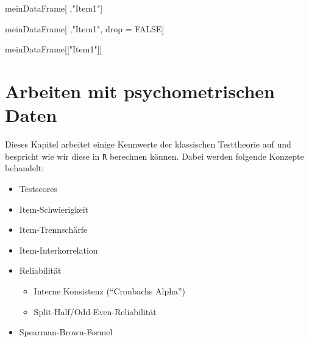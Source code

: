 \documentclass[12pt,]{tufte-book}
\newenvironment{Shaded}{\begin{snugshade}}{\end{snugshade}}
\newcommand{\StringTok}[1]{\textcolor[rgb]{0.31,0.60,0.02}{#1}}
\newcommand{\OtherTok}[1]{\textcolor[rgb]{0.56,0.35,0.01}{#1}}
\newcommand{\OperatorTok}[1]{\textcolor[rgb]{0.81,0.36,0.00}{\textbf{#1}}}
\newcommand{\NormalTok}[1]{#1}
\providecommand{\tightlist}{%
  \setlength{\itemsep}{0pt}\setlength{\parskip}{0pt}}
\theoremstyle{definition}
\theoremstyle{definition}
\theoremstyle{definition}
\theoremstyle{remark}
\begin{document}
\begin{Shaded}
\begin{Highlighting}[]
\NormalTok{meinDataFrame[ ,}\StringTok{"Item1"}\NormalTok{]}
\end{Highlighting}
\end{Shaded}

\begin{Shaded}
\begin{Highlighting}[]
\NormalTok{meinDataFrame[ ,}\StringTok{"Item1"}\NormalTok{, drop =}\StringTok{ }\OtherTok{FALSE}\NormalTok{]}
\end{Highlighting}
\end{Shaded}

\begin{Shaded}
\begin{Highlighting}[]
\NormalTok{meinDataFrame[[}\StringTok{"Item1"}\NormalTok{]]}
\end{Highlighting}
\end{Shaded}

\begin{Shaded}
\end{Shaded}

\hypertarget{psychometrie}{\chapter{Arbeiten mit psychometrischen
Daten}\label{psychometrie}}

Dieses Kapitel arbeitet einige Kennwerte der klassischen Testtheorie auf
und bespricht wie wir diese in \texttt{R} berechnen können. Dabei werden
folgende Konzepte behandelt:

\begin{itemize}
\tightlist
\item
  Testscores
\item
  Item-Schwierigkeit
\item
  Item-Trennschärfe
\item
  Item-Interkorrelation
\item
  Reliabilität

  \begin{itemize}
  \tightlist
  \item
    Interne Konsistenz (``Cronbachs Alpha'')
  \item
    Split-Half/Odd-Even-Reliabilität
  \end{itemize}
\item
  Spearman-Brown-Formel
\end{itemize}
\end{document}
